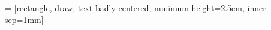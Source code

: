 % 


\newcommand{\propnode}[5]{%
	\pgfmathsetmacro{\minimalwidth}{sqrt (#4*\nodebasesize)}
	\node[#3,minimum width=\minimalwidth*1cm,inner sep=\nodeinnersep*0cm,circle,draw]
	(#2) at (#1) {#5};
}

 = [rectangle, draw, text badly centered, minimum height=2.5em, inner sep=1mm]
\newcommand{\bloq}[4]{%
	\node[bloq,#3] (#2) at (#1) {\textsf{#4}};
}
\newcommand{\add}[2]{%
	\draw (4,4) circle [radius=0.3] node (add) {\textsf$+$};
}


